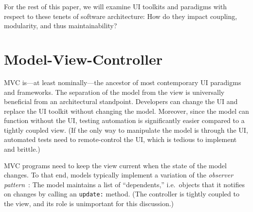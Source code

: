 \documentclass[sigplan,screen]{acmart}
\begin{document}
For the rest of this paper, we will examine UI toolkits and paradigms
with respect to these tenets of software architecture: How do they
impact coupling, modularity, and thus maintainability?  


\section{Model-View-Controller}
\label{sec:mvc}
  

MVC is---at least nominally---the ancestor of most contemporary UI
paradigms and frameworks.  The separation of the model from the view
is universally beneficial from an architectural standpoint.
Developers can change the UI and replace the UI toolkit without
changing the model.  Moreover, since the model can function without
the UI, testing automation is significantly easier compared to a
tightly coupled view.  (If the only way to manipulate the model is
through the UI, automated tests need to remote-control the UI, which
is tedious to implement and brittle.)

MVC programs need to keep the view current when the state of the model
changes.  To that end, models typically implement a variation of the
\textit{observer pattern}~\cite{GoF}: The model maintains a list of
``dependents,'' i.e.\ objects that it notifies on changes by calling
an \texttt{update:} method.  (The controller is tightly coupled to the
view, and its role is unimportant for this discussion.)
\end{document}
